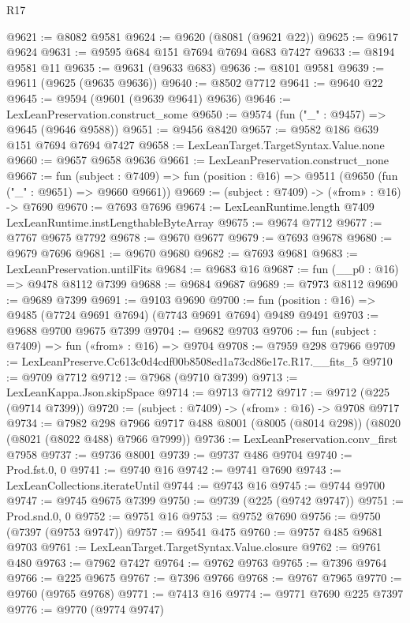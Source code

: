 \begin{lexlean}{R17}
\begin{coremodule}
@9621 := @8082 @9581
@9624 := @9620 (@8081 (@9621 @22))
@9625 := @9617 @9624
@9631 := @9595 @684 @151 @7694 @7694 @683 @7427
@9633 := @8194 @9581 @11
@9635 := @9631 (@9633 @683)
@9636 := @8101 @9581
@9639 := @9611 (@9625 (@9635 @9636))
@9640 := @8502 @7712
@9641 := @9640 @22
@9645 := @9594 (@9601 (@9639 @9641) @9636)
@9646 := LexLeanPreservation.construct_some
@9650 := @9574 (fun ("_" : @9457) => @9645 (@9646 @9588))
@9651 := @9456 @8420
@9657 := @9582 @186 @639 @151 @7694 @7694 @7427
@9658 := LexLeanTarget.TargetSyntax.Value.none
@9660 := @9657 @9658 @9636
@9661 := LexLeanPreservation.construct_none
@9667 := fun (subject : @7409) =>
  fun (position : @16) => @9511 (@9650 (fun ("_" : @9651) => @9660 @9661))
@9669 := (subject : @7409) -> («from» : @16) -> @7690
@9670 := @7693 @7696
@9674 := LexLeanRuntime.length @7409 LexLeanRuntime.instLengthableByteArray
@9675 := @9674 @7712
@9677 := @7767 @9675 @7792
@9678 := @9670 @9677
@9679 := @7693 @9678
@9680 := @9679 @7696
@9681 := @9670 @9680
@9682 := @7693 @9681
@9683 := LexLeanPreservation.untilFits
@9684 := @9683 @16
@9687 := fun (__p0 : @16) => @9478 @8112 @7399
@9688 := @9684 @9687
@9689 := @7973 @8112
@9690 := @9689 @7399
@9691 := @9103 @9690
@9700 := fun (position : @16) => @9485 (@7724 @9691 @7694) (@7743 @9691 @7694) @9489 @9491
@9703 := @9688 @9700 @9675 @7399
@9704 := @9682 @9703
@9706 := fun (subject : @7409) => fun («from» : @16) => @9704
@9708 := @7959 @298 @7966
@9709 := LexLeanPreserve.Cc613c0d4cdf00b8508ed1a73cd86e17c.R17.__fits_5
@9710 := @9709 @7712
@9712 := @7968 (@9710 @7399)
@9713 := LexLeanKappa.Json.skipSpace
@9714 := @9713 @7712
@9717 := @9712 (@225 (@9714 @7399))
@9720 := (subject : @7409) -> («from» : @16) -> @9708 @9717
@9734 := @7982
    @298
    @7966
    @9717
    @488
    @8001
    (@8005 (@8014 @298))
    (@8020 (@8021 (@8022 @488) @7966 @7999))
@9736 := LexLeanPreservation.conv_first @7958
@9737 := @9736 @8001
@9739 := @9737 @486 @9704
@9740 := Prod.fst.{0, 0}
@9741 := @9740 @16
@9742 := @9741 @7690
@9743 := LexLeanCollections.iterateUntil
@9744 := @9743 @16
@9745 := @9744 @9700
@9747 := @9745 @9675 @7399
@9750 := @9739 (@225 (@9742 @9747))
@9751 := Prod.snd.{0, 0}
@9752 := @9751 @16
@9753 := @9752 @7690
@9756 := @9750 (@7397 (@9753 @9747))
@9757 := @9541 @475
@9760 := @9757 @485 @9681 @9703
@9761 := LexLeanTarget.TargetSyntax.Value.closure
@9762 := @9761 @480
@9763 := @7962 @7427
@9764 := @9762 @9763
@9765 := @7396 @9764
@9766 := @225 @9675
@9767 := @7396 @9766
@9768 := @9767 @7965
@9770 := @9760 (@9765 @9768)
@9771 := @7413 @16
@9774 := @9771 @7690 @225 @7397
@9776 := @9770 (@9774 @9747)

\end{coremodule}
\end{lexlean}
